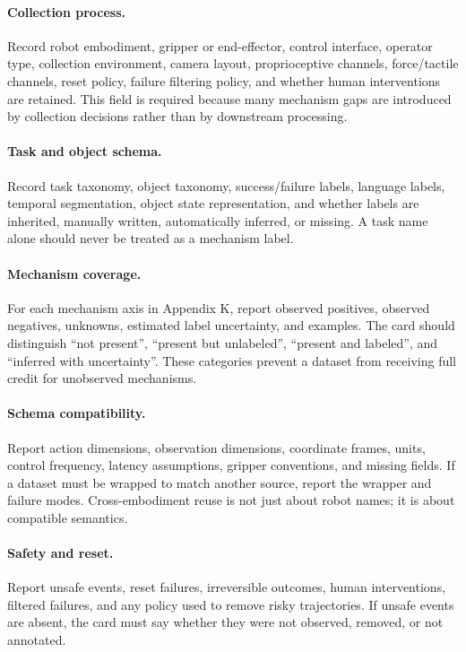 \documentclass{article}
\begin{document}
\paragraph{Collection process.}
Record robot embodiment, gripper or end-effector, control interface, operator type, collection environment, camera layout, proprioceptive channels, force/tactile channels, reset policy, failure filtering policy, and whether human interventions are retained. This field is required because many mechanism gaps are introduced by collection decisions rather than by downstream processing.

\paragraph{Task and object schema.}
Record task taxonomy, object taxonomy, success/failure labels, language labels, temporal segmentation, object state representation, and whether labels are inherited, manually written, automatically inferred, or missing. A task name alone should never be treated as a mechanism label.

\paragraph{Mechanism coverage.}
For each mechanism axis in Appendix K, report observed positives, observed negatives, unknowns, estimated label uncertainty, and examples. The card should distinguish ``not present'', ``present but unlabeled'', ``present and labeled'', and ``inferred with uncertainty''. These categories prevent a dataset from receiving full credit for unobserved mechanisms.

\paragraph{Schema compatibility.}
Report action dimensions, observation dimensions, coordinate frames, units, control frequency, latency assumptions, gripper conventions, and missing fields. If a dataset must be wrapped to match another source, report the wrapper and failure modes. Cross-embodiment reuse is not just about robot names; it is about compatible semantics.

\paragraph{Safety and reset.}
Report unsafe events, reset failures, irreversible outcomes, human interventions, filtered failures, and any policy used to remove risky trajectories. If unsafe events are absent, the card must say whether they were not observed, removed, or not annotated.
\end{document}
